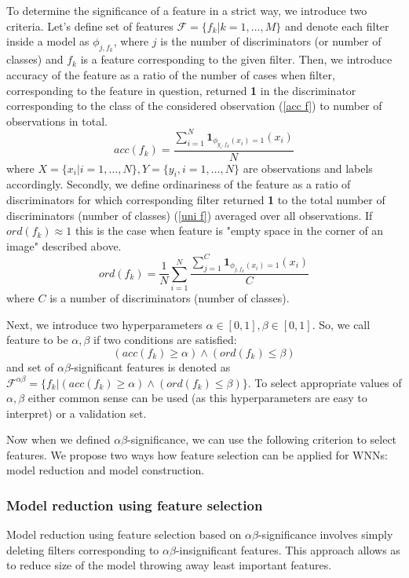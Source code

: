 \documentclass{article}[12pt]
\begin{document}
To determine the significance of a feature in a strict way, we introduce two criteria. Let's define set of features $\mathcal{F} = \{f_k|k=1,\dots,M\}$ and denote each filter inside a model as $\phi_{j,f_k}$, where $j$ is the number of discriminators (or number of classes) and $f_k$ is a feature corresponding to the given filter. Then, we introduce accuracy of the feature as a ratio of the number of cases when filter, corresponding to the feature in question, returned \textbf{1} in the discriminator corresponding to the class of the considered observation (\ref{acc f}) to number of observations in total.
\begin{equation}\label{acc f}
    acc(f_k) = \frac{\sum_{i=1}^{N}\mathbf{1}_{\phi_{y_i,f_k}(x_i) = 1}(x_i)}{N}
\end{equation}
where $X = \{x_i|i=1,\dots,N\}, Y = \{y_i,i=1,\dots,N\}$ are observations and labels accordingly.
Secondly, we define ordinariness of the feature as a ratio of discriminators for which corresponding filter returned \textbf{1} to the total number of discriminators (number of classes) (\ref{uni f}) averaged over all observations. If $ord(f_k) \approx 1$ this is the case when feature is "empty space in the corner of an image" described above.
\begin{equation}\label{uni f}
    ord(f_k) = \frac{1}{N}\sum_{i=1}^{N}\frac{\sum_{j=1}^{C}\mathbf{1}_{\phi_{j,f_k}(x_i) = 1}(x_i)}{C}
\end{equation}
where $C$ is a number of discriminators (number of classes).

Next, we introduce two hyperparameters $\alpha \in [0,1], \beta \in [0,1]$. So, we call feature to be $\alpha,\beta$ if two conditions are satisfied:
\begin{equation}
    (acc(f_k) \ge \alpha) \wedge (ord(f_k) \le \beta)
\end{equation}
and set of $\alpha\beta$-significant features is denoted as $\mathcal{F}^{\alpha\beta} = \{f_k| (acc(f_k) \ge \alpha) \wedge (ord(f_k) \le \beta)\}$. To select appropriate values of $\alpha, \beta$ either common sense can be used (as this hyperparameters are easy to interpret) or a validation set.

Now when we defined $\alpha\beta$-significance, we can use the following criterion to select features. We propose two ways how feature selection can be applied for WNNs: model reduction and model construction.

\subsubsection*{Model reduction using feature selection}
Model reduction using feature selection based on $\alpha\beta$-significance involves simply deleting filters corresponding to $\alpha\beta$-insignificant features. This approach allows as to reduce size of the model throwing away least important features.
\end{document}
